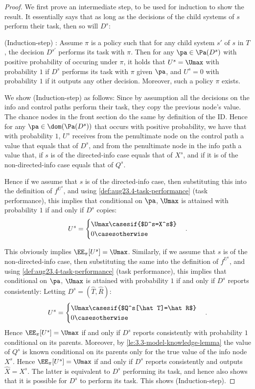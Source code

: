 \begin{proof}
We first prove an intermediate step, to be used for induction to show the result. It essentially says that as long as the decisions of the child systems of $s$ perform their task, then so will $D^s$:

(Induction-step) : Assume $\pi$ is a policy such that for any child system $s'$ of $s$ in $T$, the decision $D^{s'}$ performs its task with $\pi$. Then for any $\pa\in \Pa(D^s)$ with positive probability of occuring under $\pi$, it holds that $U^s=\Umax$ with probability $1$ if $D^s$ performs its task with $\pi$ given $\pa$, and $U^s=0$ with probability $1$ if it outputs any other decision. Moreover, such a policy $\pi$ exists.

We show (Induction-step) as follows: Since by assumption all the decisions on the info and control paths perform their task, they copy the previous node's value. The chance nodes in the front section do the same by definition of the ID.
    Hence for any $\pa\in \dom(\Pa(D^s))$ that occurs with positive probability, we have that with probability $1$, $U^s$ receives from the penultimate node on the control path a value that 
    equals that of $D^s$, and from the penultimate node in the info path a value that, if $s$ is of the directed-info case equals that of $X^s$, and if it is of the non-directed-info case equals that of $Q^s$.
    
    Hence if we assume that $s$ is of the directed-info case, then substituting this into the definition of $f^{U^s}$, and using \autoref{def:aug23.4-task-performance} (task performance), this implies that conditional on $\pa$, $\Umax$ is attained with probability $1$ if and only if $D^s$ copies:
        \[U^s = 
        \begin{cases}
        \Umax \casesif {$D^s=X^s$}\\
        0  \casesotherwise 
        \end{cases}.\]
    
    This obviously implies $\EE_\pi[U^s]=\Umax$. Similarly, if we assume that $s$ is of the non-directed-info case, then substituting the same into the definition of $f^{U^s}$, and using \autoref{def:aug23.4-task-performance} (task performance), this implies that conditional on $\pa$, $\Umax$ is attained with probability $1$ if and only if $D^s$ reports consistently: Letting
    $D^s= (\hat T,\hat R)$:
    \[U^s = 
        \begin{cases}
        \Umax \casesif {$Q^s[\hat T]=\hat R$}\\
        0  \casesotherwise 
        \end{cases}.\]
    Hence $\EE_\pi[U^s]=\Umax$ if and only if $D^s$ reports consistently with probability $1$ conditional on its parents. Moreover, by \autoref{le:3.3-model-knowledge-lemma} the value of $Q^s$ is known conditional on its parents only for the true value of the info node $X^s$. Hence $\EE_\pi[U^s]=\Umax$ if and only if $D^s$ reports consistently and outputs $\hat X=X^s$. The latter is equivalent to $D^s$ performing its task, and hence also shows that it is possible for $D^s$ to perform its task. This shows (Induction-step).


\end{proof}
